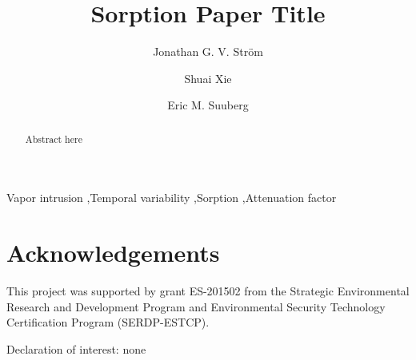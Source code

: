 \documentclass[preprint,12pt]{elsarticle}
\begin{document}
\begin{frontmatter}
\title{Sorption Paper Title}

\author[Brown]{Jonathan G. V. Ström}
\author[Brown]{Shuai Xie}
\author[Brown]{Eric M. Suuberg}


\address{These authors contributed equally to this work}
\address[Brown]{Brown University, School of Engineering, Providence, RI, USA}

\begin{abstract}
Abstract here
\end{abstract}

\begin{keyword}
  Vapor intrusion \sep Temporal variability \sep Sorption \sep Attenuation factor
\end{keyword}

\end{frontmatter}







\section*{Acknowledgements}
This project was supported by grant ES-201502 from the Strategic Environmental Research and Development Program and Environmental Security Technology Certification Program (SERDP-ESTCP).\par

Declaration of interest: none




\end{document}

